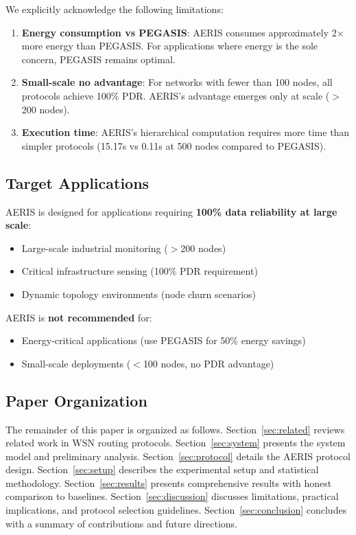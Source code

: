 We explicitly acknowledge the following limitations:

\begin{enumerate}
    \item \textbf{Energy consumption vs PEGASIS}: AERIS consumes approximately
    2$\times$ more energy than PEGASIS. For applications where energy is the
    sole concern, PEGASIS remains optimal.

    \item \textbf{Small-scale no advantage}: For networks with fewer than 100
    nodes, all protocols achieve 100\% PDR. AERIS's advantage emerges only
    at scale ($>$200 nodes).

    \item \textbf{Execution time}: AERIS's hierarchical computation requires
    more time than simpler protocols (15.17s vs 0.11s at 500 nodes compared
    to PEGASIS).
\end{enumerate}

\subsection{Target Applications}

AERIS is designed for applications requiring \textbf{100\% data reliability
at large scale}:

\begin{itemize}
    \item Large-scale industrial monitoring ($>$200 nodes)
    \item Critical infrastructure sensing (100\% PDR requirement)
    \item Dynamic topology environments (node churn scenarios)
\end{itemize}

AERIS is \textbf{not recommended} for:
\begin{itemize}
    \item Energy-critical applications (use PEGASIS for 50\% energy savings)
    \item Small-scale deployments ($<$100 nodes, no PDR advantage)
\end{itemize}

\subsection{Paper Organization}

The remainder of this paper is organized as follows. Section~\ref{sec:related}
reviews related work in WSN routing protocols. Section~\ref{sec:system}
presents the system model and preliminary analysis. Section~\ref{sec:protocol}
details the AERIS protocol design. Section~\ref{sec:setup} describes the
experimental setup and statistical methodology. Section~\ref{sec:results}
presents comprehensive results with honest comparison to baselines.
Section~\ref{sec:discussion} discusses limitations, practical implications,
and protocol selection guidelines. Section~\ref{sec:conclusion} concludes
with a summary of contributions and future directions.
